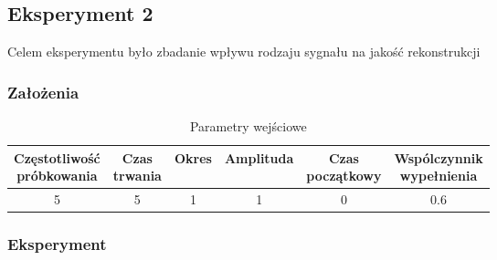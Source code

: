 \documentclass{article}
\begin{document}
\subsection{Eksperyment 2}
    Celem eksperymentu było zbadanie wpływu rodzaju sygnału na jakość
    rekonstrukcji

    \subsubsection{Założenia}
    \begin{table}[h!]
        \centering
        \begin{tabular}{|c|c|c|c|c|c|}
            \hline
            \shortstack{Częstotliwość\\ próbkowania} & \shortstack{Czas\\ trwania} & Okres & Amplituda & \shortstack{Czas\\ początkowy} & \shortstack{Wspólczynnik\\ wypełnienia}   \\ \hline
            5 & 5 & 1 & 1 & 0 & 0.6  \\ \hline
        \end{tabular}
        \caption{Parametry wejściowe}
    \end{table}
    
    \subsubsection{Eksperyment}
\end{document}
